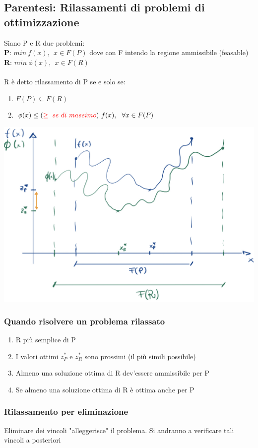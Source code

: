 \documentclass[12pt,a4paper]{article}
\begin{document}
\subsection{Parentesi: Rilassamenti di problemi di ottimizzazione}
Siano P e R due problemi:\\
\textbf{P}: $min \ f(x), \ \ x \in F(P)$ dove con F intendo la regione ammissibile (feasable)\\
\textbf{R}: $min \ \phi(x), \ \ x \in F(R)$\\
\\
R è detto rilassamento di P se e solo se:
\begin{enumerate}
\item $F(P) \subseteq F(R)$
\item $\phi(x) \leq (\textcolor{red}{\geq \ se\ di\ massimo})\ f(x), \ \ \forall x \in F(P)$
\end{enumerate}
\begin{center}
\includegraphics[width=0.5\columnwidth]{img/rilassamento.jpg}
\end{center}

\subsubsection{Quando risolvere un problema rilassato}
\begin{enumerate}
\item R più semplice di P
\item I valori ottimi $z_P^*$ e $z_R^*$ sono prossimi (il più simili possibile)
\item Almeno una soluzione ottima di R dev'essere ammissibile per P
\item Se almeno una soluzione ottima di R è ottima anche per P
\end{enumerate}

\subsubsection{Rilassamento per eliminazione}
Eliminare dei vincoli "alleggerisce" il problema. Si andranno a verificare tali vincoli a posteriori
\end{document}
